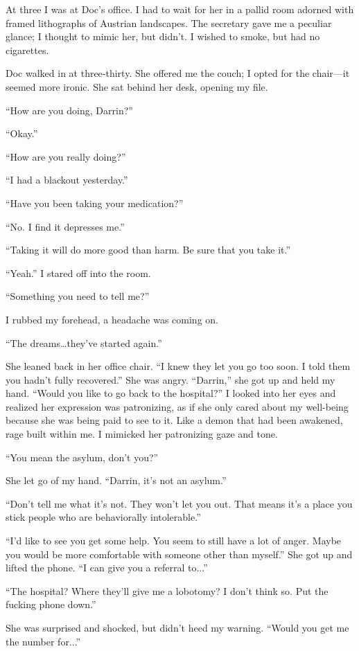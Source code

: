 At three I was at Doc's office. I had to wait for her in a pallid room
adorned with framed lithographs of Austrian landscapes. The secretary
gave me a peculiar glance; I thought to mimic her, but didn't. I wished
to smoke, but had no cigarettes.

Doc walked in at three-thirty. She offered me the couch; I opted for the
chair---it seemed more ironic. She sat behind her desk, opening my file.

``How are you doing, Darrin?''

``Okay.''

``How are you really doing?''

``I had a blackout yesterday.''

``Have you been taking your medication?''

``No. I find it depresses me.''

``Taking it will do more good than harm. Be sure that you take it.''

``Yeah.'' I stared off into the room.

``Something you need to tell me?''

I rubbed my forehead, a headache was coming on.

``The dreams\ldots they've started again.''

She leaned back in her office chair. ``I knew they let you go too soon.
I told them you hadn't fully recovered.'' She was angry. ``Darrin,'' she
got up and held my hand. ``Would you like to go back to the hospital?''
I looked into her eyes and realized her expression was patronizing, as
if she only cared about my well-being because she was being paid to see
to it. Like a demon that had been awakened, rage built within me. I
mimicked her patronizing gaze and tone.

``You mean the asylum, don't you?''

She let go of my hand. ``Darrin, it's not an asylum.''

``Don't tell me what it's not. They won't let you out. That means it's a
place you stick people who are behaviorally intolerable.''

``I'd like to see you get some help. You seem to still have a lot of
anger. Maybe you would be more comfortable with someone other than
myself.'' She got up and lifted the phone. ``I can give you a referral
to...''

``The hospital? Where they'll give me a lobotomy? I don't think so. Put
the fucking phone down.''

She was surprised and shocked, but didn't heed my warning. ``Would you
get me the number for...''

